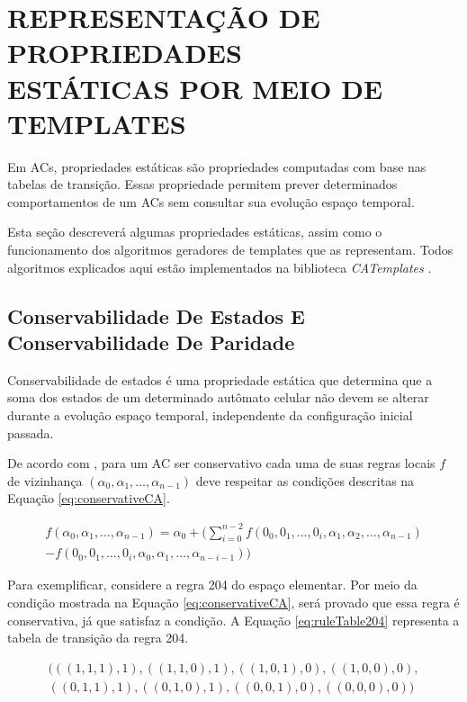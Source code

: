 \documentclass[12pt,a4paper]{article}
\let\stdsection\section
\renewcommand\section{\newpage\stdsection}
\begin{document}
\section[REPRESENTAÇÃO DE PROPRIEDADES ESTÁTICAS POR MEIO DE TEMPLATES]{REPRESENTAÇÃO DE PROPRIEDADES \\ ESTÁTICAS POR MEIO DE TEMPLATES}
\label{sec:propriedadesEstaticas}

	Em ACs, propriedades estáticas são propriedades computadas com base nas tabelas de transição. Essas propriedade permitem prever determinados comportamentos de um ACs sem consultar sua evolução espaço temporal. 

	Esta seção descreverá algumas propriedades estáticas, assim como o funcionamento dos algoritmos geradores de templates que as representam. Todos algoritmos explicados aqui estão implementados na biblioteca \textit{CATemplates} \cite{CATemplates}.

	\subsection{Conservabilidade De Estados E Conservabilidade De Paridade}
	Conservabilidade de estados é uma propriedade estática que determina que a soma dos estados de um determinado autômato celular não devem se alterar durante a evolução espaço temporal, independente da configuração inicial passada.

	De acordo com \cite{boccara2002}, para um AC ser conservativo cada uma de suas regras locais $f$ de vizinhança $(\alpha_0,\alpha_1, \dots, \alpha_{n-1})$ deve respeitar as condições descritas na Equação \ref{eq:conservativeCA}.

	\begin{equation}
	\begin{split}
	f(\alpha_0,\alpha_1, \dots,\alpha_{n-1}) = \alpha_0 + (\sum_{i=0}^{n-2}f(0_0,0_1, \dots,0_i,\alpha_1,\alpha_2, \dots,\alpha_{n-1}) \\- f(0_0,0_1, \dots,0_i,\alpha_0,\alpha_1, \dots,\alpha_{n-i-1}))
	\label{eq:conservativeCA}
	\end{split}
	\end{equation}

	Para exemplificar, considere a regra 204 do espaço elementar. Por meio da condição mostrada na Equação \ref{eq:conservativeCA}, será provado que essa regra é conservativa, já que satisfaz a condição. A Equação \ref{eq:ruleTable204} representa a tabela de transição da regra 204.

	\begin{equation}
	\begin{split}
	(((1,1,1),1),((1,1,0),1),((1,0,1),0),((1,0,0),0),\\((0,1,1),1),((0,1,0),1),((0,0,1),0),((0,0,0),0))
	\label{eq:ruleTable204}
	\end{split}
	\end{equation}
\end{document}
